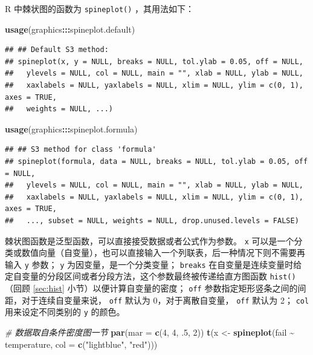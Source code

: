 \documentclass[
  b5paper,
  UTF8,twoside]{book}
\newenvironment{Shaded}{\begin{snugshade}}{\end{snugshade}}
\newcommand{\AttributeTok}[1]{\textcolor[rgb]{0.13,0.29,0.53}{#1}}
\newcommand{\CommentTok}[1]{\textcolor[rgb]{0.56,0.35,0.01}{\textit{#1}}}
\newcommand{\DecValTok}[1]{\textcolor[rgb]{0.00,0.00,0.81}{#1}}
\newcommand{\FunctionTok}[1]{\textcolor[rgb]{0.13,0.29,0.53}{\textbf{#1}}}
\newcommand{\NormalTok}[1]{#1}
\newcommand{\OtherTok}[1]{\textcolor[rgb]{0.56,0.35,0.01}{#1}}
\newcommand{\SpecialCharTok}[1]{\textcolor[rgb]{0.81,0.36,0.00}{\textbf{#1}}}
\newcommand{\StringTok}[1]{\textcolor[rgb]{0.31,0.60,0.02}{#1}}
\begin{document}
R 中棘状图的函数为 \texttt{spineplot()} ，其用法如下：

\begin{Shaded}
\begin{Highlighting}[]
\FunctionTok{usage}\NormalTok{(graphics}\SpecialCharTok{:::}\NormalTok{spineplot.default)}
\end{Highlighting}
\end{Shaded}

\begin{verbatim}
## ## Default S3 method:
## spineplot(x, y = NULL, breaks = NULL, tol.ylab = 0.05, off = NULL,
##   ylevels = NULL, col = NULL, main = "", xlab = NULL, ylab = NULL,
##   xaxlabels = NULL, yaxlabels = NULL, xlim = NULL, ylim = c(0, 1), axes = TRUE,
##   weights = NULL, ...)
\end{verbatim}

\begin{Shaded}
\begin{Highlighting}[]
\FunctionTok{usage}\NormalTok{(graphics}\SpecialCharTok{:::}\NormalTok{spineplot.formula)}
\end{Highlighting}
\end{Shaded}

\begin{verbatim}
## ## S3 method for class 'formula'
## spineplot(formula, data = NULL, breaks = NULL, tol.ylab = 0.05, off = NULL,
##   ylevels = NULL, col = NULL, main = "", xlab = NULL, ylab = NULL,
##   xaxlabels = NULL, yaxlabels = NULL, xlim = NULL, ylim = c(0, 1), axes = TRUE,
##   ..., subset = NULL, weights = NULL, drop.unused.levels = FALSE)
\end{verbatim}

棘状图函数是泛型函数，可以直接接受数据或者公式作为参数。 \texttt{x} 可以是一个分类或数值向量（自变量），也可以直接输入一个列联表，后一种情况下则不需要再输入 \texttt{y} 参数； \texttt{y} 为因变量，是一个分类变量； \texttt{breaks} 在自变量是连续变量时给定自变量的分段区间或者分段方法，这个参数最终被传递给直方图函数 \texttt{hist()} （回顾 \ref{sec:hist} 小节）以便计算自变量的密度； \texttt{off} 参数指定矩形竖条之间的间距，对于连续自变量来说， \texttt{off} 默认为 0，对于离散自变量， \texttt{off} 默认为 2； \texttt{col} 用来设定不同类别的 \texttt{y} 的颜色。





\begin{Shaded}
\begin{Highlighting}[]
\CommentTok{\# 数据取自条件密度图一节}
\FunctionTok{par}\NormalTok{(}\AttributeTok{mar =} \FunctionTok{c}\NormalTok{(}\DecValTok{4}\NormalTok{, }\DecValTok{4}\NormalTok{, .}\DecValTok{5}\NormalTok{, }\DecValTok{2}\NormalTok{))}
\FunctionTok{t}\NormalTok{(x }\OtherTok{\textless{}{-}} \FunctionTok{spineplot}\NormalTok{(fail }\SpecialCharTok{\textasciitilde{}}\NormalTok{ temperature, }\AttributeTok{col =} \FunctionTok{c}\NormalTok{(}\StringTok{"lightblue"}\NormalTok{, }\StringTok{"red"}\NormalTok{)))}
\end{Highlighting}
\end{Shaded}
\end{document}
